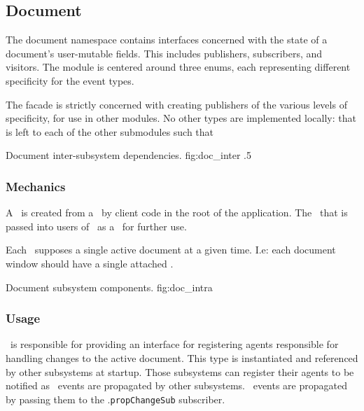 \newcommand{\docarea}[3]{
      \index{#1}\pbodyitem{#2}{#3}
}

\newcommand{\extparamref}[3]{
      \index{#1}\pbodyitem{#2}{#3}
}

\subsection{Document}
The document namespace contains interfaces concerned with the state of a document's user-mutable fields.
This includes publishers, subscribers, and visitors.
The module is centered around three enums, each representing different specificity for the event types.

The facade is strictly concerned with creating publishers of the various levels of specificity, for use in other modules.
No other types are implemented locally: that is left to each of the other submodules such that 

{Document inter-subsystem dependencies.}
{fig:doc_inter}
{.5}


\subsubsection{Mechanics}
A \docsftype\ is created from a \docsfftype\ by client code in the root of the application.
The \docsftype\ that is passed into users of \docmod\ as a \docftype\ for further use.

Each \docftype\ supposes a single active document at a given time.
I.e: each document window should have a single attached \docftype.

{Document subsystem components.}
{fig:doc_intra}



\subsubsection{Usage}
\docftype\ is responsible for providing an interface for registering agents responsible for handling changes to the active document.
This type is instantiated and referenced by other subsystems at startup.
Those subsystems can register their agents to be notified as \docpctype\ events are propagated by other subsystems.
\docpctype\ events are propagated by passing them to the \docftype .\texttt{propChangeSub} subscriber.